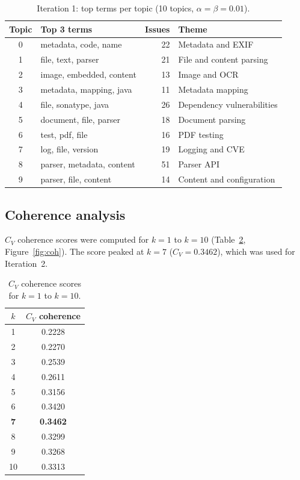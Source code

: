 \documentclass[11pt,a4paper]{report}
\begin{document}
\begin{table}[H]
  \centering
  \caption{Iteration 1: top terms per topic (10 topics, $\alpha=\beta=0.01$).}
  \label{tab:lda1}
  \begin{tabular}{clrl}
    \toprule
    \textbf{Topic} & \textbf{Top 3 terms} & \textbf{Issues} & \textbf{Theme} \\
    \midrule
    0 & metadata, code, name       & 22 & Metadata and EXIF \\
    1 & file, text, parser         & 21 & File and content parsing \\
    2 & image, embedded, content   & 13 & Image and OCR \\
    3 & metadata, mapping, java    & 11 & Metadata mapping \\
    4 & file, sonatype, java       & 26 & Dependency vulnerabilities \\
    5 & document, file, parser     & 18 & Document parsing \\
    6 & test, pdf, file            & 16 & PDF testing \\
    7 & log, file, version         & 19 & Logging and CVE \\
    8 & parser, metadata, content  & 51 & Parser API \\
    9 & parser, file, content      & 14 & Content and configuration \\
    \bottomrule
  \end{tabular}
\end{table}

\subsection*{Coherence analysis}
$C_V$ coherence scores were computed for $k=1$ to $k=10$
(Table~\ref{tab:coh}, Figure~\ref{fig:coh}). The score peaked at $k=7$
($C_V=0.3462$), which was used for Iteration~2.

\begin{table}[H]
  \centering
  \caption{$C_V$ coherence scores for $k=1$ to $k=10$.}
  \label{tab:coh}
  \begin{tabular}{cc}
    \toprule
    $k$ & $C_V$ coherence \\
    \midrule
    1 & 0.2228 \\ 2 & 0.2270 \\ 3 & 0.2539 \\ 4 & 0.2611 \\ 5 & 0.3156 \\
    6 & 0.3420 \\ \textbf{7} & \textbf{0.3462} \\ 8 & 0.3299 \\ 9 & 0.3268 \\
    10 & 0.3313 \\
    \bottomrule
  \end{tabular}
\end{table}
\end{document}
